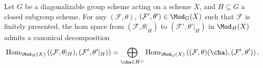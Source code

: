 \begin{prop}
\label{prop:HInvariantsOfHomSpace}
Let $G$ be a diagonalizable group scheme acting on a scheme $X$, and $H\subseteq G$ a closed subgroup scheme.
For any
$(\mathcal{F}, \theta)$,
$(\mathcal{F}', \theta') \in \Mod_G(X)$
such that
$\mathcal{F}$
is finitely presented,
the hom space
from
$(\mathcal{F}, \theta|_H)$
to
$(\mathcal{F}', \theta'|_H)$
in $\Mod_H(X)$
admits a canonical decomposition
$$
\operatorname{Hom}_{\Mod_H(X)}\left( (\mathcal{F}, \theta|_H), (\mathcal{F}', \theta'|_H) \right)
=
\bigoplus_{\cha \in H^\perp} \operatorname{Hom}_{\Mod_G(X)}\left( (\mathcal{F}, \theta)(\cha), (\mathcal{F}', \theta') \right).
$$
\end{prop}




